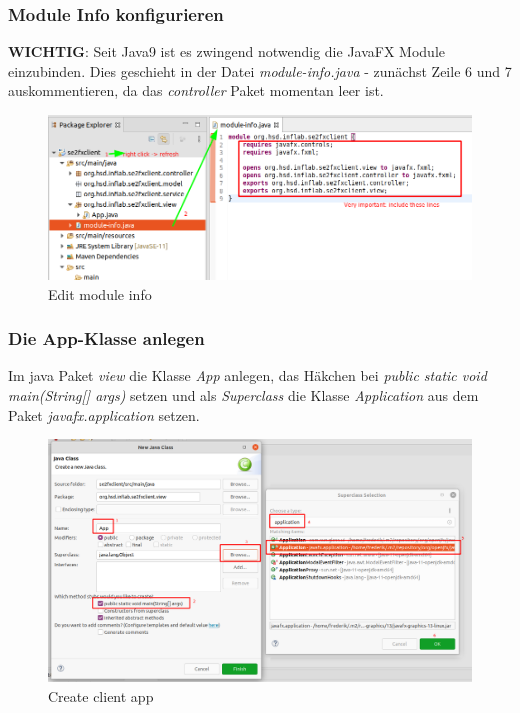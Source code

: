 \documentclass[11pt]{scrartcl}
\begin{document}
\subsubsection{Module Info konfigurieren}
\label{sec:moduleinfo}
\textbf{WICHTIG}: Seit Java9 ist es zwingend notwendig die JavaFX Module einzubinden.
Dies geschieht in der Datei \textit{module-info.java} - zunächst Zeile
6 und  7 auskommentieren, da das \textit{controller} Paket momentan leer ist.
\begin{figure}[!ht]
    \includegraphics[width=\linewidth]{images/eclipse21_client_module_info.png}
    \caption{Edit module info}
    \label{fig:editmoduleinfo}
\end{figure}

\newpage
\subsubsection{Die App-Klasse anlegen}
\label{sec:createappclass}
Im java Paket \textit{view} die Klasse \textit{App} anlegen,\newline
das Häkchen bei \textit{public static void main(String[] args)} setzen
und als \textit{Superclass} die Klasse \textit{Application} aus dem
Paket \textit{javafx.application} setzen.

\begin{figure}[!ht]
    \includegraphics[width=\linewidth]{images/eclipse20_client_app.png}
    \caption{Create client app}
    \label{fig:createclientapp}
\end{figure}
\end{document}
